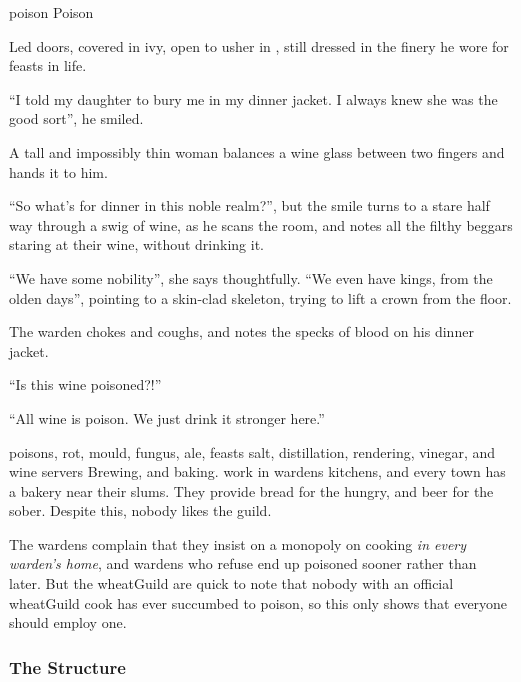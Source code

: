 \begin{multicols}{2}
  {\gls{poison}}%
  {Poison}%
  {
    Led doors, covered in ivy, open to usher in , still dressed in the finery he wore for feasts in life.

    ``I told my daughter to bury me in my dinner jacket.
    I always knew she was the good sort'', he smiled.

    A tall and impossibly thin woman balances a wine glass between two fingers and hands it to him.

    ``So what's for dinner in this noble realm?'', but the smile turns to a stare half way through a swig of wine, as he scans the room, and notes all the filthy beggars staring at their wine, without drinking it.

    {\sffamily ``We have some nobility''}, she says thoughtfully.
    {\sffamily ``We even have kings, from the olden days''}, pointing to a skin-clad skeleton, trying to lift a crown from the floor.

    The \gls{warden} chokes and coughs, and notes the specks of blood on his dinner jacket.

    ``Is this wine poisoned?!''

    {\sffamily ``All wine is poison.
    We just drink it stronger here.''}
  }%
  {poisons, rot, mould, fungus, ale, feasts}%
  {salt, distillation, rendering, vinegar, and wine}%
  {\Glspl{server}}%
  {
    Brewing, and baking.
  }%
work in \glspl{warden} kitchens, and every town has a bakery near their slums.
They provide bread for the hungry, and beer for the sober.
Despite this, nobody likes the guild.

The \glspl{warden} complain that they insist on a monopoly on cooking \emph{in every \gls{warden}'s home}, and \glspl{warden} who refuse end up poisoned sooner rather than later.
But the \gls{wheatGuild} are quick to note that nobody with an official \gls{wheatGuild} cook has ever succumbed to poison, so this only shows that everyone should employ one.


\subsubsection{The Structure}



\end{multicols}
